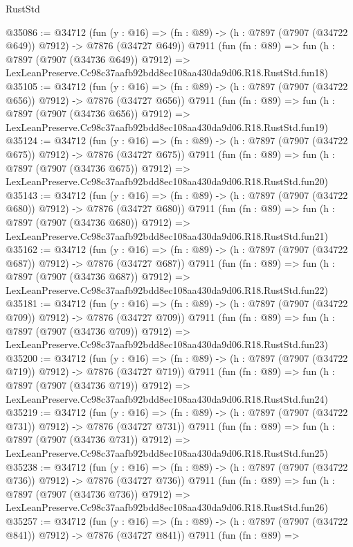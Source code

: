 \begin{lexlean}{RustStd}
\begin{coremodule}
@35086 := @34712
    (fun (y : @16) => (fn : @89) -> (h : @7897 (@7907 (@34722 @649)) @7912) -> @7876 (@34727 @649))
    @7911
    (fun (fn : @89) =>
    fun (h : @7897 (@7907 (@34736 @649)) @7912) =>
    LexLeanPreserve.Cc98c37aafb92bdd8ec108aa430da9d06.R18.RustStd.fun18)
@35105 := @34712
    (fun (y : @16) => (fn : @89) -> (h : @7897 (@7907 (@34722 @656)) @7912) -> @7876 (@34727 @656))
    @7911
    (fun (fn : @89) =>
    fun (h : @7897 (@7907 (@34736 @656)) @7912) =>
    LexLeanPreserve.Cc98c37aafb92bdd8ec108aa430da9d06.R18.RustStd.fun19)
@35124 := @34712
    (fun (y : @16) => (fn : @89) -> (h : @7897 (@7907 (@34722 @675)) @7912) -> @7876 (@34727 @675))
    @7911
    (fun (fn : @89) =>
    fun (h : @7897 (@7907 (@34736 @675)) @7912) =>
    LexLeanPreserve.Cc98c37aafb92bdd8ec108aa430da9d06.R18.RustStd.fun20)
@35143 := @34712
    (fun (y : @16) => (fn : @89) -> (h : @7897 (@7907 (@34722 @680)) @7912) -> @7876 (@34727 @680))
    @7911
    (fun (fn : @89) =>
    fun (h : @7897 (@7907 (@34736 @680)) @7912) =>
    LexLeanPreserve.Cc98c37aafb92bdd8ec108aa430da9d06.R18.RustStd.fun21)
@35162 := @34712
    (fun (y : @16) => (fn : @89) -> (h : @7897 (@7907 (@34722 @687)) @7912) -> @7876 (@34727 @687))
    @7911
    (fun (fn : @89) =>
    fun (h : @7897 (@7907 (@34736 @687)) @7912) =>
    LexLeanPreserve.Cc98c37aafb92bdd8ec108aa430da9d06.R18.RustStd.fun22)
@35181 := @34712
    (fun (y : @16) => (fn : @89) -> (h : @7897 (@7907 (@34722 @709)) @7912) -> @7876 (@34727 @709))
    @7911
    (fun (fn : @89) =>
    fun (h : @7897 (@7907 (@34736 @709)) @7912) =>
    LexLeanPreserve.Cc98c37aafb92bdd8ec108aa430da9d06.R18.RustStd.fun23)
@35200 := @34712
    (fun (y : @16) => (fn : @89) -> (h : @7897 (@7907 (@34722 @719)) @7912) -> @7876 (@34727 @719))
    @7911
    (fun (fn : @89) =>
    fun (h : @7897 (@7907 (@34736 @719)) @7912) =>
    LexLeanPreserve.Cc98c37aafb92bdd8ec108aa430da9d06.R18.RustStd.fun24)
@35219 := @34712
    (fun (y : @16) => (fn : @89) -> (h : @7897 (@7907 (@34722 @731)) @7912) -> @7876 (@34727 @731))
    @7911
    (fun (fn : @89) =>
    fun (h : @7897 (@7907 (@34736 @731)) @7912) =>
    LexLeanPreserve.Cc98c37aafb92bdd8ec108aa430da9d06.R18.RustStd.fun25)
@35238 := @34712
    (fun (y : @16) => (fn : @89) -> (h : @7897 (@7907 (@34722 @736)) @7912) -> @7876 (@34727 @736))
    @7911
    (fun (fn : @89) =>
    fun (h : @7897 (@7907 (@34736 @736)) @7912) =>
    LexLeanPreserve.Cc98c37aafb92bdd8ec108aa430da9d06.R18.RustStd.fun26)
@35257 := @34712
    (fun (y : @16) => (fn : @89) -> (h : @7897 (@7907 (@34722 @841)) @7912) -> @7876 (@34727 @841))
    @7911
    (fun (fn : @89) =>

\end{coremodule}
\end{lexlean}
